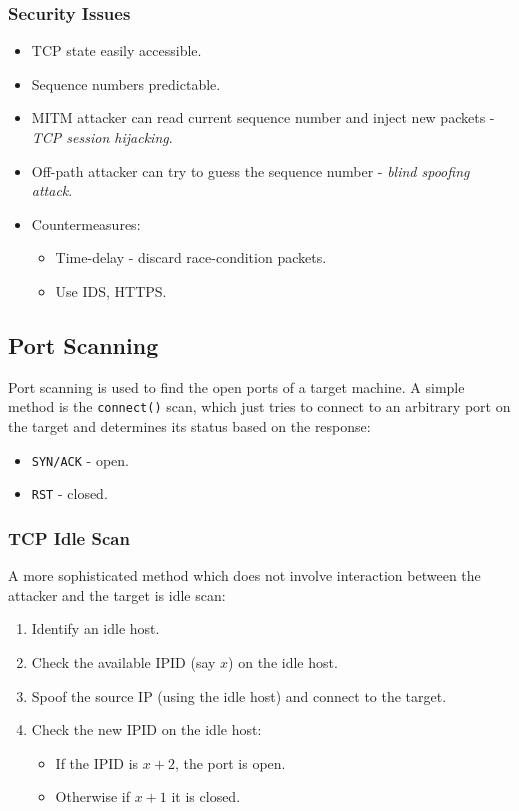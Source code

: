 \documentclass[11pt]{article}
\begin{document}
\subsubsection{Security Issues}
\begin{itemize}
  \item TCP state easily accessible.
  \item Sequence numbers predictable.
  \item MITM attacker can read current sequence number and inject new packets - \textit{TCP session hijacking}.
  \item Off-path attacker can try to guess the sequence number - \textit{blind spoofing attack}.
  \item Countermeasures:
    \begin{itemize}
      \item Time-delay - discard race-condition packets.
      \item Use IDS, HTTPS.
    \end{itemize}
\end{itemize}

\subsection{Port Scanning}
Port scanning is used to find the open ports of a target machine.
A simple method is the \texttt{connect()} scan, which just tries to connect to an arbitrary port on the target and determines its status based on the response:
\begin{itemize}
  \item \texttt{SYN/ACK} - open.
  \item \texttt{RST} - closed.
\end{itemize}

\subsubsection{TCP Idle Scan}
A more sophisticated method which does not involve interaction between the attacker and the target is idle scan:
\begin{enumerate}
  \item Identify an idle host.
  \item Check the available IPID (say $x$) on the idle host.
  \item Spoof the source IP (using the idle host) and connect to the target.
  \item Check the new IPID on the idle host:
    \begin{itemize}
      \item If the IPID is $x + 2$, the port is open.
      \item Otherwise if $x + 1$ it is closed.
    \end{itemize}
\end{enumerate}
\end{document}
